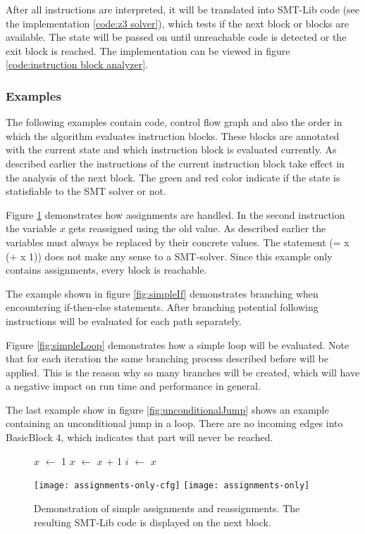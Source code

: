 After all instructions are interpreted, it will be translated into SMT-Lib code (see the implementation \ref{code:z3 solver}), which tests if the next block or blocks are available. 
The state will be passed on until unreachable code is detected or the exit block is reached.
The implementation can be viewed in figure \ref{code:instruction block analyzer}. 

\subsubsection{Examples}
The following examples contain code, control flow graph and also the order in which the algorithm evaluates instruction blocks. These blocks are annotated with the current state and which instruction block is evaluated currently. As described earlier the instructions of the current instruction block take effect in the analysis of the next block. The green and red color indicate if the state is statisfiable to the SMT solver or not.


Figure \ref{fig:assignmentOnly} demonstrates how assignments are handled. In the second instruction the variable $x$ gets reassigned using the old value.
As described earlier the variables must always be replaced by their concrete values. The statement (= x (+ x 1)) does not make any sense to a SMT-solver. 
Since this example only contains assignments, every block is reachable.


The example shown in figure \ref{fig:simpleIf} demonstrates branching when encountering if-then-else statements. After branching potential following instructions will be evaluated for each path separately. 


Figure \ref{fig:simpleLoop} demonstrates how a simple loop will be evaluated. Note that for each iteration the same branching process described before will be applied. 
This is the reason why so many branches will be created, which will have a negative impact on run time and performance in general.


The last example show in figure \ref{fig:unconditionalJump} shows an example containing an unconditional jump in a loop. There are no incoming edges into BasicBlock 4, which indicates that part will never be reached.

\begin{figure}[!h]
	\begin{GenericCode}
		$x$ $\leftarrow$ 1
		$x$ $\leftarrow$ $x$ + 1
		$i$ $\leftarrow$ $x$
	\end{GenericCode}
	\centering
	\texttt{[image: assignments-only-cfg]}
	\texttt{[image: assignments-only]}
	\caption{Demonstration of simple assignments and reassignments. The resulting SMT-Lib code is displayed on the next block.}
	\label{fig:assignmentOnly}
\end{figure}

